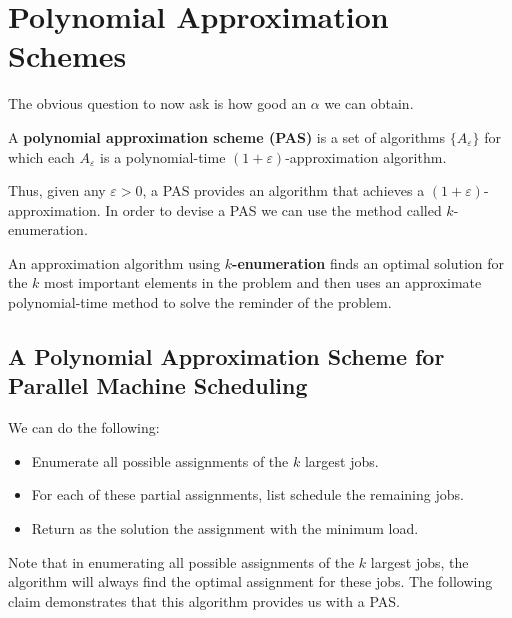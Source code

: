 \documentclass{article}
\begin{document}
\section{Polynomial Approximation Schemes}

The obvious question to now ask is how good an $\alpha$ we can obtain.

\begin{definition}
A \textbf{polynomial approximation scheme (PAS)} is a set of algorithms $\{ A_\varepsilon \}$ for
which each $A_\varepsilon$ is a polynomial-time $(1+\varepsilon)$-approximation algorithm.
\end{definition}

Thus, given any $\varepsilon >0$, a PAS provides an algorithm that achieves a
$(1+\varepsilon)$-approximation. In order to devise a PAS we can use the method called
$k$-enumeration.

\begin{definition}
An approximation algorithm using \textbf{$k$-enumeration} finds an optimal solution for the $k$
most important elements in the problem and then uses an approximate polynomial-time method to
solve the reminder of the problem.
\end{definition}

\subsection{A Polynomial Approximation Scheme for Parallel Machine Scheduling}

We can do the following:

\begin{itemize}

\item Enumerate all possible assignments of the $k$ largest jobs.

\item For each of these partial assignments, list schedule the remaining jobs.

\item Return as the solution the assignment with the minimum load.

\end{itemize}

Note that in enumerating all possible assignments of the $k$ largest jobs, the algorithm will
always find the optimal assignment for these jobs. The following claim demonstrates that this
algorithm provides us with a PAS.

{}
\end{document}
